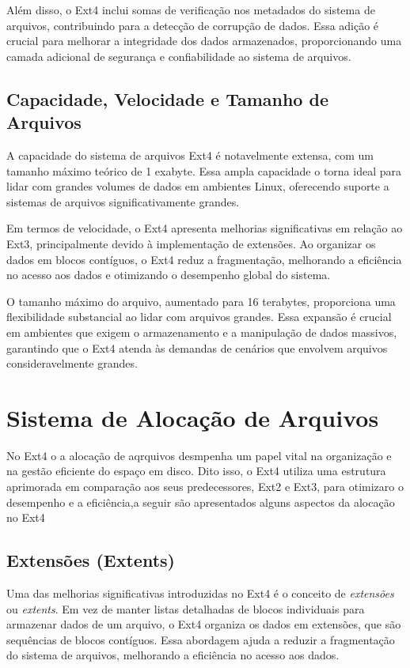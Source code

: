 \documentclass[
	12pt,				%
	openright,			%
	oneside,			%
	a4paper,			%
	chapter=TITLE,		%
	english,			%
	french,				%
	spanish,			%
	brazil				%
	]{abntex2}
\theoremstyle{definition}
\begin{document}
Além disso, o Ext4 inclui somas de verificação nos metadados do sistema de arquivos, contribuindo 
para a detecção de corrupção de dados. Essa adição é crucial para melhorar a integridade dos dados 
armazenados, proporcionando uma camada adicional de segurança e confiabilidade ao sistema de arquivos.

\section{Capacidade, Velocidade e Tamanho de Arquivos}
A capacidade do sistema de arquivos Ext4 é notavelmente extensa, com um tamanho máximo teórico de 1 exabyte. Essa 
ampla capacidade o torna ideal para lidar com grandes volumes de dados em ambientes Linux, oferecendo suporte a 
sistemas de arquivos significativamente grandes.

Em termos de velocidade, o Ext4 apresenta melhorias significativas em relação ao Ext3, principalmente devido 
à implementação de extensões. Ao organizar os dados em blocos contíguos, o Ext4 reduz a fragmentação, melhorando 
a eficiência no acesso aos dados e otimizando o desempenho global do sistema.

O tamanho máximo do arquivo, aumentado para 16 terabytes, proporciona uma flexibilidade substancial ao lidar 
com arquivos grandes. Essa expansão é crucial em ambientes que exigem o armazenamento e a manipulação de dados 
massivos, garantindo que o Ext4 atenda às demandas de cenários que envolvem arquivos consideravelmente grandes.


\chapter{Sistema de Alocação de Arquivos}
No Ext4 o a alocação de aqrquivos desmpenha um papel vital na organização e na gestão eficiente do espaço em disco. 
Dito isso, o Ext4 utiliza uma estrutura aprimorada em comparação aos seus predecessores, Ext2 e Ext3, para otimizaro 
o desempenho e a eficiência,a seguir são apresentados alguns aspectos da alocação no Ext4

\section{Extensões (Extents)}
Uma das melhorias significativas introduzidas no Ext4 é o conceito de \textit{extensões} ou \textit{extents}. Em vez de manter listas detalhadas de blocos individuais para armazenar dados de um arquivo, o Ext4 organiza os dados em extensões, que são sequências de blocos contíguos. Essa abordagem ajuda a reduzir a fragmentação do sistema de arquivos, melhorando a eficiência no acesso aos dados.
\end{document}
